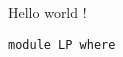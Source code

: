 \documentclass{article}
\begin{document}
Hello world !
\bc\begin{verbatim}module LP where\end{verbatim}\ec
\end{document}
